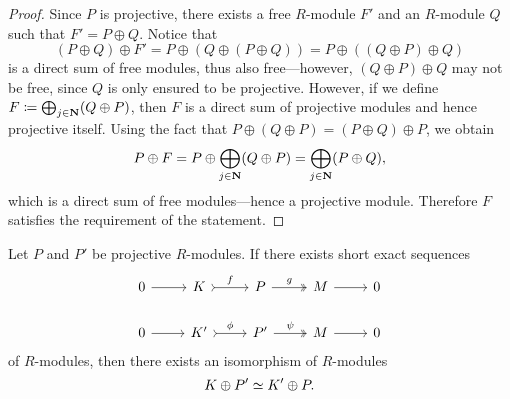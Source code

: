 \begin{proof}
    Since \(P\) is projective, there exists a free \(R\)-module \(F'\) and an
    \(R\)-module \(Q\) such that \(F' = P \oplus Q\). Notice that
    \[
        (P \oplus Q) \oplus F'
        = P \oplus (Q \oplus (P \oplus Q))
        = P \oplus ((Q \oplus P) \oplus Q)
    \]
    is a direct sum of free modules, thus also free---however, \((Q \oplus P) \oplus
    Q\) may not be free, since \(Q\) is only ensured to be projective. However, if
    we define \(F \coloneq \bigoplus_{j \in \mathbf{N}} (Q \oplus P)\), then \(F\) is a
    direct sum of projective modules and hence projective itself. Using the
    fact that \(P \oplus (Q \oplus P) = (P \oplus Q) \oplus P\), we obtain
    \[
        P \oplus F
        = P \oplus \bigoplus_{j \in \mathbf{N}} (Q \oplus P)
        = \bigoplus_{j \in \mathbf{N}} (P \oplus Q),
    \]
    which is a direct sum of free modules---hence a projective module. Therefore
    \(F\) satisfies the requirement of the statement.
\end{proof}

\begin{proposition}[Schanuel]
    \label{prop:schanuel-lemma}
    Let \(P\) and \(P'\) be projective \(R\)-modules. If there exists short exact
    sequences
    \[
        \begin{tikzcd}
            0 \ar[r] &K \ar[r, tail, "f"] &P \ar[r, two heads, "g"] &M \ar[r] &0
            \\
            0 \ar[r] &K' \ar[r, tail, "\phi"] &P' \ar[r, two heads, "\psi"] &M \ar[r] &0
        \end{tikzcd}
    \]
    of \(R\)-modules, then there exists an isomorphism of \(R\)-modules
    \[
        K \oplus P' \simeq K' \oplus P.
    \]
\end{proposition}

